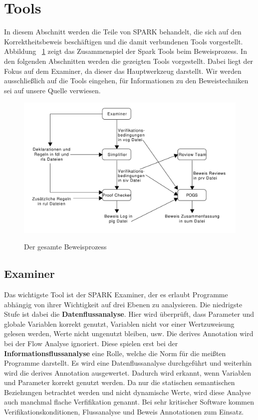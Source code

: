 
\section{Tools}
\label{sec:tools}
In diesem Abschnitt werden die Teile von SPARK behandelt, die sich auf den Korrektheitsbeweis beschäftigen und die damit verbundenen Tools vorgestellt.
Abbildung ~\ref{fig:proofProcess} zeigt das Zusammenspiel der Spark Tools beim Beweisprozess. In den folgenden Abschnitten werden die gezeigten Tools vorgestellt. Dabei liegt der Fokus auf dem Examiner, da dieser das Hauptwerkzeug darstellt. Wir werden ausschließlich auf die Tools eingehen, für Informationen zu den Beweistechniken sei auf unsere Quelle verwiesen.

\begin{figure}[h]
\includegraphics[width=\textwidth{}]{images/ProofProcess.pdf}
\label{fig:proofProcess}
\caption{Der gesamte Beweisprozess}
\end{figure}

\subsection{Examiner}
\label{sec:examiner}
Das wichtigste Tool ist der SPARK Examiner, der es erlaubt Programme abhängig von ihrer Wichtigkeit auf drei Ebenen zu analysieren. Die niedrigste Stufe ist dabei die \textbf{Datenflussanalyse}. Hier wird überprüft, dass Parameter und globale Variablen korrekt genutzt, Variablen nicht vor einer Wertzuweisung gelesen werden, Werte nicht ungenutzt bleiben, usw. Die derives Annotation wird bei der Flow Analyse ignoriert.
Diese spielen erst bei der \textbf{Informationsflussanalyse} eine Rolle, welche die Norm für die meißten Programme darstellt. Es wird eine Datenflussanalyse durchgeführt und weiterhin wird die derives Annotation ausgewertet. Dadurch wird erkannt, wenn Variablen und Parameter korrekt genutzt werden. Da nur die statischen semantischen Beziehungen betrachtet werden und nicht dynamische Werte, wird diese Analyse auch manchmal flache Verfifikation genannt.
Bei sehr kritischer Software kommen Verifikationskonditionen, Flussanalyse und Beweis Annotationen zum Einsatz.

